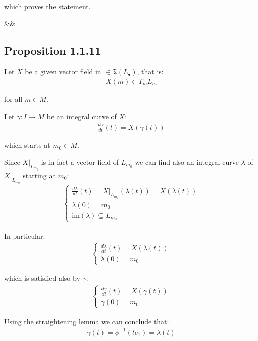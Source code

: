 				which proves the statement.

				\begin{flalign*}&&\square\end{flalign*}


		\subsection{Proposition 1.1.11}	
		Let $X$ be a given vector field in $\in \mathfrak{T}(L_\bullet)$, that is:
		\begin{align*}
			X(m) \in T_m L_m
		\end{align*}

		for all $m \in M$. \bigskip

		Let $\gamma : I \to M$ be an integral curve of $X$:
		\begin{align*}
			\frac{d \gamma}{dt}(t) = X(\gamma(t))
		\end{align*}

		which starts at $m_0 \in M$. \bigskip

		Since $X|_{L_{m_0}}$ is in fact a vector field of $L_{m_0}$ we can find also an integral curve $\lambda$ of $X|_{L_{m_0}}$ starting at $m_0$:
		\begin{align*}
			\begin{cases}
				\frac{d \lambda}{dt}(t) = X|_{L_{m_0}}(\lambda(t)) = X(\lambda(t)) \\
				\lambda(0) = m_0 \\
				\text{im}(\lambda) \subseteq L_{m_0}
			\end{cases}
		\end{align*}

		In particular:
		\begin{align*}
			\begin{cases}
				\frac{d \lambda}{dt}(t) = X(\lambda(t)) \\
				\lambda(0) = m_0
			\end{cases}
		\end{align*}

		which is satisfied also by $\gamma$:
		\begin{align*}
			\begin{cases}
				\frac{d \gamma}{dt}(t) = X(\gamma(t)) \\
				\gamma(0) = m_0
			\end{cases}	
		\end{align*}

		Using the straightening lemma we can conclude that:
		\begin{align*}
			\gamma(t) = \phi^{-1}(t e_1) = \lambda(t)
		\end{align*}

